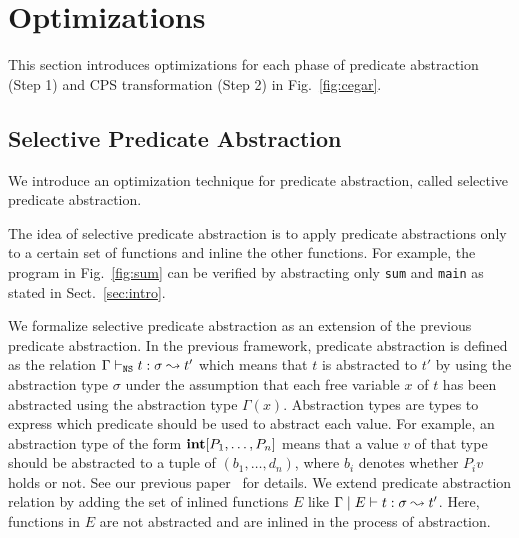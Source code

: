
\section{Optimizations}
\label{sec:opt}

This section introduces optimizations for each phase of predicate
abstraction (Step 1) and CPS transformation (Step 2) in Fig.~\ref{fig:cegar}.

\subsection{Selective Predicate Abstraction}

We introduce an optimization technique for predicate abstraction, called
selective predicate abstraction.

The idea of selective predicate abstraction is to apply predicate
abstractions only to a certain set of functions and inline the other
functions.  For example, the program in Fig.~\ref{fig:sum} can
be verified by abstracting only \texttt{sum} and \texttt{main} as stated
in Sect.~\ref{sec:intro}.

We formalize selective predicate abstraction as an extension of the
previous predicate abstraction.  In the previous framework, predicate
abstraction is defined as the relation
${\Gamma} \vdash_{\texttt{NS}} {t} : {\sigma} \leadsto {t'}$ which means that $t$ is abstracted to
$t'$ by using the abstraction type $\sigma$ under the assumption that
each free variable $x$ of $t$ has been abstracted using the abstraction
type $\Gamma(x)$.  Abstraction types are types to express which
predicate should be used to abstract each value.  For example, an
abstraction type of the form $\mathbf{int}[P_1,\dots,P_n]$ means that a value
$v$ of that type should be abstracted to a tuple of $(b_1,\dots,d_n)$,
where $b_i$ denotes whether $P_i{v}$ holds or not.  See our previous
paper~\cite{KobayashiPLDI2011} for details.  We extend predicate
abstraction relation by adding the set of inlined functions $E$ like
${\Gamma} \mid {E} \vdash {t} : {\sigma} \leadsto {t'}$.  Here, functions in $E$ are not
abstracted and are inlined in the process of abstraction.

